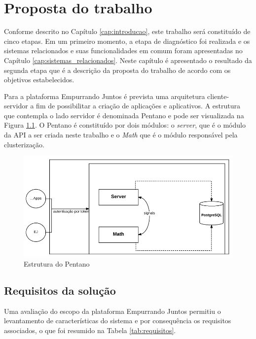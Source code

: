 \chapter{Proposta do trabalho} \label{cap:proposta}

Conforme descrito no Capítulo \ref{cap:introducao}, este trabalho será constituído de cinco etapas.
Em um primeiro momento, a etapa de diagnóstico foi realizada e os sistemas relacionados e suas funcionalidades em comum 
foram apresentadas no Capítulo \ref{cap:sistemas_relacionados}. Neste capítulo é apresentado o resultado da segunda etapa
que é a descrição da proposta do trabalho de acordo com os objetivos estabelecidos.

Para a plataforma Empurrando Juntos é prevista uma arquitetura cliente-servidor a fim de possibilitar a criação de aplicações e
aplicativos. A estrutura que contempla o lado servidor é denominada Pentano e pode ser visualizada na Figura \ref{fig:pentano}. 
O Pentano é constituído por dois módulos: o \textit{server}, 
que é o módulo da API a ser criada neste trabalho e o \textit{Math} que é o módulo responsável pela clusterização. 

\begin{figure}[h!]
\centering
\includegraphics[scale=0.8]{figuras/esquema_pentano.png}
\caption{Estrutura do Pentano}
\label{fig:pentano}
\end{figure}

\section{Requisitos da solução}

Uma avaliação do escopo da plataforma Empurrando Juntos permitiu o levantamento de características do sistema e por consequência
os requisitos associados, o que foi resumido na Tabela \ref{tab:requisitos}.

